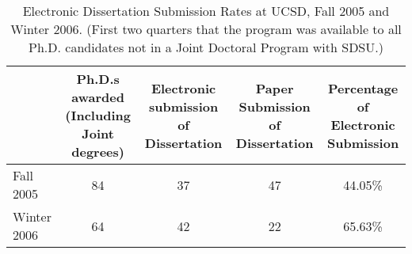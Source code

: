 \documentclass[12pt]{ucsddissertation}
\theoremstyle{plain}%
\theoremstyle{definition}
\begin{document}
\begin{table}
\centering
\caption[Electronic Dissertation Submission Rates]{Electronic
Dissertation Submission Rates at UCSD, Fall 2005 and Winter 2006.
(First two quarters that the program was available to all Ph.D.
candidates not in a Joint Doctoral Program with SDSU.)}
\label{tab:good}
\renewcommand\tabularxcolumn[1]{>{\RaggedRight\arraybackslash}p{#1}}
\begin{tabularx}{.9\linewidth}{lcccc}
\toprule
&\multicolumn{1}{X}{Ph.D.s awarded (Including Joint degrees)}
&\multicolumn{1}{X}{Electronic submission of Dissertation}
&\multicolumn{1}{X}{Paper Submission of Dissertation}
&\multicolumn{1}{X}{Percentage of Electronic Submission}\\
\midrule
Fall 2005 & 84 & 37 & 47 & 44.05\%\\
Winter 2006 & 64 & 42 & 22 & 65.63\%\\
\bottomrule
\end{tabularx}
\end{table}
\end{document}
